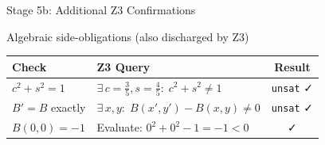 \documentclass[aspectratio=169]{beamer}
\begin{document}
\begin{frame}{Stage 5b: Additional Z3 Confirmations}
\begin{block}{Algebraic side-obligations (also discharged by Z3)}
\end{block}

\vspace{0.3em}
\renewcommand{\arraystretch}{1.6}
\begin{tabular}{@{}lp{7cm}c@{}}
\toprule
\textbf{Check} & \textbf{Z3 Query} & \textbf{Result} \\
\midrule
$c^2 + s^2 = 1$ &
  $\exists\, c{=}\tfrac{3}{5}, s{=}\tfrac{4}{5}:\; c^2{+}s^2 \ne 1$
  & \textcolor{safe}{\texttt{unsat} \faCheck} \\
$B' = B$ exactly &
  $\exists\, x,y:\; B(x',y') - B(x,y) \ne 0$
  & \textcolor{safe}{\texttt{unsat} \faCheck} \\
$B(0,0) = -1$ &
  Evaluate: $0^2 + 0^2 - 1 = -1 < 0$
  & \textcolor{safe}{\faCheck} \\
\bottomrule
\end{tabular}

\vspace{0.5em}
\begin{center}
\end{center}
\end{frame}
\end{document}
